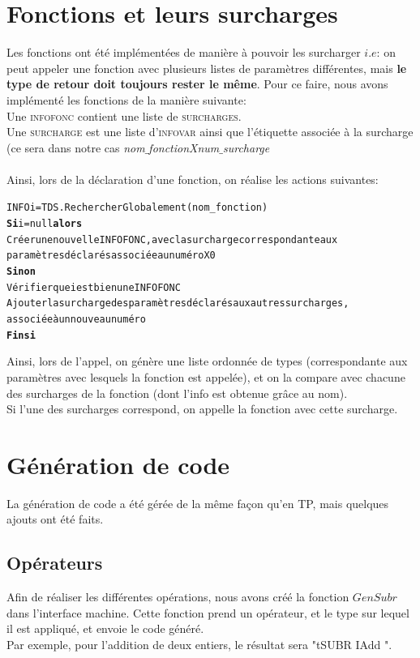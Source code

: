 \documentclass[11pt,a4paper]{report}
\begin{document}
\section{Fonctions et leurs surcharges}

Les fonctions ont été implémentées de manière à pouvoir les surcharger $i.e$: on peut appeler une fonction avec plusieurs listes de paramètres différentes, mais {\bf le type de retour doit toujours rester le même}. Pour ce faire, nous avons implémenté les fonctions de la manière suivante: \\
Une \textsc{infofonc} contient une liste de \textsc{surcharges}. \\
Une \textsc{surcharge} est une liste d'\textsc{infovar} ainsi que l'étiquette associée à la surcharge (ce sera dans notre cas \textsl{nom$\_$fonctionXnum$\_$surcharge}  \\\\
Ainsi, lors de la déclaration d'une fonction, on réalise les actions suivantes: 
\begin{alltt}
INFO i = TDS.RechercherGlobalement(nom_fonction)
  {\bf Si} i = null {\bf alors}
      Créer une nouvelle INFOFONC, avec la surcharge correspondante aux 
      paramètres déclarés associée au numéro X0
  {\bf Sinon}
      Vérifier que i est bien une INFOFONC
      Ajouter la surcharge des paramètres déclarés aux autres surcharges,
      associée à un nouveau numéro
  {\bf Fin si} 
\end{alltt}

Ainsi, lors de l'appel, on génère une liste ordonnée de types (correspondante aux paramètres avec lesquels la fonction est appelée), et on la compare avec chacune des surcharges de la fonction (dont l'info est obtenue grâce au nom). \\ 
Si l'une des surcharges correspond, on appelle la fonction avec cette surcharge.

\section{Génération de code}

La génération de code a été gérée de la même façon qu'en TP, mais quelques ajouts ont été faits.

\subsection{Opérateurs}

Afin de réaliser les différentes opérations, nous avons créé la fonction 
$GenSubr$ dans l'interface machine. Cette fonction prend un opérateur, et le type sur lequel il est appliqué, et envoie le code généré. \\
Par exemple, pour l'addition de deux entiers, le résultat sera "tSUBR IAdd ".
\end{document}
